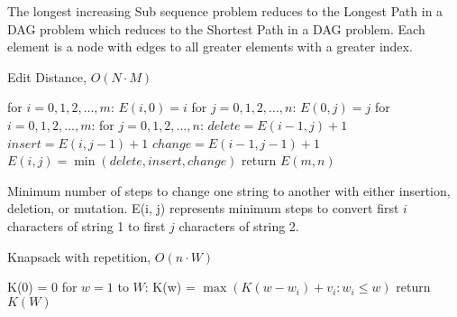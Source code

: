 \documentclass{article}
\begin{document}
\begin{multicols}{2}
\setlength{\floatsep}{0.0cm}
The longest increasing Sub sequence problem reduces to the Longest Path in a DAG problem which reduces to the Shortest Path in a DAG problem. Each element is a node with edges to all greater elements with a greater index. 
\setlength{\textfloatsep}{0.0cm}
\begin{algorithm}[H]
\label{alg:quad}
\caption{Edit Distance, $O(N \cdot M)$}\label{euclid}
\begin{algorithmic}[1]
\State for $i = 0, 1, 2, \ldots, m$: 
\Indent
\State $E(i, 0) = i$
\EndIndent
\State for $j = 0, 1, 2, \ldots, n$: 
\Indent
\State $E(0, j) = j$
\EndIndent
\State for $i = 0, 1, 2, \ldots, m$: 
\Indent 
\State for $j = 0, 1, 2, \ldots, n$: 
\Indent 
\State $delete = E(i-1, j) +1$
\State $insert = E(i, j-1) + 1$
\State $change = E(i-1, j-1) + 1$
\State $E(i, j) = \min(delete, insert, change)$
\EndIndent 
\EndIndent 
\State return $E(m, n)$
\end{algorithmic}
\end{algorithm}
\setlength{\floatsep}{0.0cm}
Minimum number of steps to change one string to another with either insertion, deletion, or mutation. E(i, j) represents minimum steps to convert first $i$ characters of string 1 to first $j$ characters of string 2. 

\setlength{\textfloatsep}{0.0cm}
\begin{algorithm}[H]
\label{alg:quad}
\caption{Knapsack with repetition, $O(n \cdot W)$}\label{euclid}
\begin{algorithmic}[1]
\State K(0) = 0
\State for $w = 1$ to $W$: 
\Indent 
\State K(w) = $\max(K(w-w_i) + v_i: w_i \leq w)$
\EndIndent 
\State return $K(W)$
\end{algorithmic}
\end{algorithm}
\setlength{\floatsep}{0.0cm}


\end{multicols}
\end{document}
